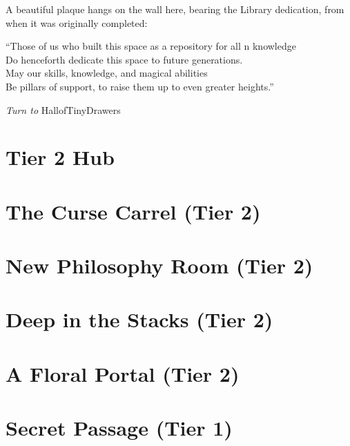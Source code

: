 \documentclass[sheet]{GL2020}
\begin{document}
A beautiful plaque hangs on the wall here, bearing the Library dedication, from when it was originally completed:

\begin{centering}
``Those of us who built this space as a repository for all \pEarth{}n knowledge\\
Do henceforth dedicate this space to future generations.\\

May our skills, knowledge, and magical abilities\\
Be pillars of support, to raise them up to even greater heights.''\\
\end{centering}

\emph{Turn to \pageref{TierOneHub}}HallofTinyDrawers

\clearpage



\section*{Tier 2 Hub}
\label{TierTwoHub}

\clearpage


\section*{The Curse Carrel (Tier 2)}
\label{CurseCarrel}

\clearpage

\section*{New Philosophy Room (Tier 2)}
\label{NewPhilosophy}

\clearpage

\section*{Deep in the Stacks (Tier 2)}
\label{DeepStacks}

\clearpage

\section*{A Floral Portal (Tier 2)}
\label{FloralPortal}

\clearpage

\section*{Secret Passage (Tier 1)}
\label{SecretPassage}
\end{document}
